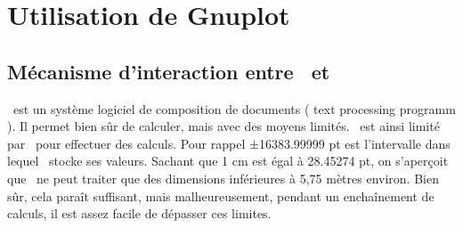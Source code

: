 \section{Utilisation de Gnuplot}
\subsection{Mécanisme d'interaction entre \TIKZ\ et }

\TEX\  est un système logiciel de composition de documents ( text processing programm ). Il permet bien sûr de calculer, mais avec des moyens limités. \TIKZ\ est ainsi limité par \TEX\ pour effectuer des calculs. Pour rappel ±16383.99999 pt est l'intervalle dans lequel \TEX\ stocke ses valeurs. Sachant que 1 cm est égal à 28.45274 pt, on s'aperçoit que \TEX\ ne  peut traiter que des dimensions inférieures à 5,75 mètres environ.
Bien sûr, cela paraît suffisant, mais malheureusement, pendant un enchaînement de calculs, il est assez facile de dépasser ces limites.

\bigskip 
 \tkzActivOff  
  \newcommand{\drawpage}[4]{%
  \begin{scope}[xshift=#1, yshift=#2,font=\footnotesize]
    \filldraw[fill=white!75!#4,draw=#4, very thin]%
   (0,0) -- (4.2,0) -- (4.2,4.85) --(3.21,5.84)-- (0,5.84) -- cycle;
   \fill[fill=#4,shade,top color=#4,bottom color=#4!40]%
       (3.21,5.84) -- ++(0,-0.99) -- ++(0.99,0) -- cycle;
    \path (2.1,2.97) node{#3};
  \end{scope}
}

